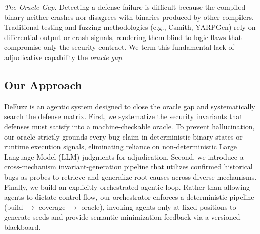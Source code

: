 \documentclass[conference]{IEEEtran}
\begin{document}
\emph{The Oracle Gap.} Detecting a defense failure is difficult because the compiled binary neither crashes nor disagrees with binaries produced by other compilers. Traditional testing and fuzzing methodologies (e.g., Csmith, YARPGen) rely on differential output or crash signals, rendering them blind to logic flaws that compromise only the security contract. We term this fundamental lack of adjudicative capability the \emph{oracle gap}.

\subsection{Our Approach}
DeFuzz is an agentic system designed to close the oracle gap and systematically search the defense matrix. First, we systematize the security invariants that defenses must satisfy into a machine-checkable oracle. To prevent hallucination, our oracle strictly grounds every bug claim in deterministic binary states or runtime execution signals, eliminating reliance on non-deterministic Large Language Model (LLM) judgments for adjudication. Second, we introduce a cross-mechanism invariant-generation pipeline that utilizes confirmed historical bugs as probes to retrieve and generalize root causes across diverse mechanisms. Finally, we build an explicitly orchestrated agentic loop. Rather than allowing agents to dictate control flow, our orchestrator enforces a deterministic pipeline (build $\rightarrow$ coverage $\rightarrow$ oracle), invoking agents only at fixed positions to generate seeds and provide semantic minimization feedback via a versioned blackboard.
\end{document}
